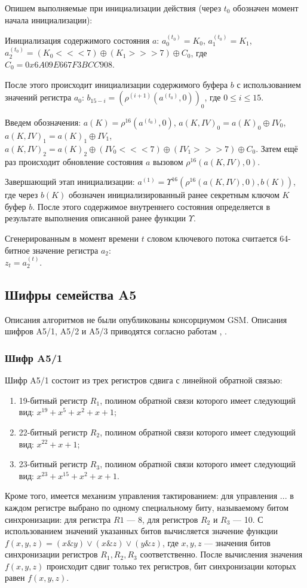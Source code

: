 \documentclass{./civarticle}
\begin{document}
Опишем выполняемые при инициализации действия (через $t_0$ обозначен момент начала инициализации):

Инициализация содержимого состояния $a$: $a_0^{(t_0)} = K_0$, $a_1^{(t_0)} = K_1$, $a_2^{(t_0)} = (K_0 <<< 7) \oplus (K_1 >>> 7) \oplus C_0$, где $C_0 = 0x6A09E667F3BCC908$.

После этого происходит инициализации содержимого буфера $b$ с использованием значений регистра $a_0$: $b_{15-i} = (\rho^{(i + 1)}(a^{(t_0)}, 0))_0$, где $0 \leq i \leq 15$.

Введем обозначения: $a(K) = \rho^{16}(a^{(t_0)}, 0)$, $a(K, IV)_0 = a(K)_0 \oplus IV_0$, $a(K, IV)_1 = a(K)_1 \oplus IV_1$, $a(K, IV)_2 = a(K)_2 \oplus (IV_0 <<< 7) \oplus (IV_1 >>> 7) \oplus C_0$. Затем ещё раз происходит обновление состояния $a$ вызовом $\rho^{16}(a(K, IV), 0)$.

Завершающий этап инициализации: $a^{(1)} = \Upsilon^{16}(\rho^{16}(a(K, IV), 0), b(K))$, где через $b(K)$ обозначен инициализированный ранее секретным ключом $K$ буфер $b$. После этого содержимое внутреннего состояния определяется в результате выполнения описанной ранее функции $\Upsilon$.

Сгенерированным в момент времени $t$ словом ключевого потока считается 64-битное значение регистра $a_2$: \\ $z_t = a_2^{(t)}$.

\subsection{Шифры семейства A5}
Описания алгоритмов не были опубликованы консорциумом GSM.
Описания шифров A5/1, A5/2 и A5/3 приводятся согласно работам \cite{a5_1}, \cite{a5_2}.

\subsubsection{Шифр A5/1}
Шифр A5/1 состоит из трех регистров сдвига с линейной обратной связью:
\begin{enumerate}
    \item 19-битный регистр $R_1$, полином обратной связи которого имеет следующий вид: $x^{19} + x^{5} + x^{2} + x + 1$;
    \item 22-битный регистр $R_2$, полином обратной связи которого имеет следующий вид: $x^{22} + x + 1$;
    \item 23-битный регистр $R_3$, полином обратной связи которого имеет следующий вид: $x^{23} + x^{15} + x^{2} + x + 1$.
\end{enumerate}
Кроме того, имеется механизм управления тактированием:
для управления ... в каждом регистре выбрано по одному специальному биту, называемому битом синхронизации: для регистра $R1$ --- 8, для регистров $R_2$ и $R_3$ --- 10. С использованием значений указанных битов вычисляется значение функции $f(x, y, z) = (x \& y) \vee (x \& z) \vee (y \& z)$, где $x, y, z$ --- значения битов синхронизации регистров $R_1, R_2, R_3$ соответственно. После вычисления значения $f(x, y, z)$ происходит сдвиг только тех регистров, бит синхронизации которых равен $f(x, y, z)$.
\end{document}

